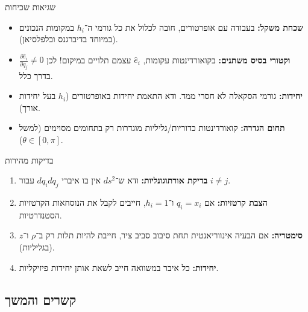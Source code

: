 \documentclass{article}
\begin{document}
\begin{warningbox}{שגיאות שכיחות}
\begin{itemize}
\item \textbf{שכחת משקל:} בעבודה עם אופרטורים, חובה לכלול את כל גורמי ה־$h_i$ במקומות הנכונים (במיוחד בדיברגנס ובלפלסיאן).
\item \textbf{וקטורי בסיס משתנים:} בקואורדינטות עקומות, $\hat{e}_i$ עצמם תלויים במיקום! לכן $\frac{\partial\hat{e}_i}{\partial q_j} \neq 0$ בדרך כלל.
\item \textbf{יחידות:} גורמי הסקאלה לא חסרי ממד. ודא התאמת יחידות באופרטורים ($h_i$ בעל יחידות אורך).
\item \textbf{תחום הגדרה:} קואורדינטות כדוריות/גליליות מוגדרות רק בתחומים מסוימים (למשל $\theta \in [0,\pi]$).
\end{itemize}
\end{warningbox}

\begin{importantbox}{בדיקות מהירות}
\begin{enumerate}
\item \textbf{בדיקת אורתוגונליות:} ודא ש־$ds^2$ אין בו איברי $dq_i dq_j$ עבור $i\neq j$.
\item \textbf{הצבת קרטזיות:} אם $q_i = x_i$ ו־$h_i = 1$, חייבים לקבל את הנוסחאות הקרטזיות הסטנדרטיות.
\item \textbf{סימטריה:} אם הבעיה אינווריאנטית תחת סיבוב סביב ציר, חייבת להיות תלות רק ב־$\rho$ ו־$z$ (בגליליות).
\item \textbf{יחידות:} כל איבר במשוואה חייב לשאת אותן יחידות פיזיקליות.
\end{enumerate}
\end{importantbox}

\subsection*{קשרים והמשך}
\end{document}

